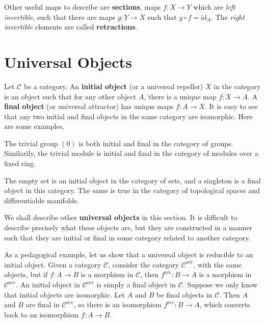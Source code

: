 Other useful maps to describe are {\bf sections}, maps $f: X \to Y$ which are {\it left invertible}, such that there are maps $g: Y \to X$ such that $g \circ f = \text{id}_A$. The {\it right invertible} elements are called {\bf retractions}.

\section{Universal Objects}

Let $\mathcal{C}$ be a category. An {\bf initial object} (or a universal repeller) $X$ in the category is an object such that for any other object $A$, there is a unique map $f: X \to A$. A {\bf final object} (or universal attractor) has unique maps $f: A \to X$. It is easy to see that any two initial and final objects in the same category are isomorphic. Here are some examples,
%
\begin{example}
    The trivial group $(0)$ is both initial and final in the category of groups. Similarily, the trivial module is initial and final in the category of modules over a fixed ring.
\end{example}

\begin{example}
    The empty set is an initial object in the category of sets, and a singleton is a final object in this category. The same is true in the category of topological spaces and differentiable manifolds.
\end{example}

We shall describe other {\bf universal objects} in this section. It is difficult to describe precisely what these objects are, but they are constructed in a manner such that they are initial or final in some category related to another category.

\begin{example}
    As a pedagogical example, let us show that a universal object is reducible to an initial object. Given a category $\mathcal{C}$, consider the category $\mathcal{C}^{\text{rev}}$, with the same objects, but if $f: A \to B$ is a morphism in $\mathcal{C}$, then $f^{\text{rev}}: B \to A$ is a morphism in $\mathcal{C}^{\text{rev}}$. An initial object in $\mathcal{C}^{\text{rev}}$ is simply a final object in $\mathcal{C}$. Suppose we only know that initial objects are isomorphic. Let $A$ and $B$ be final objects in $\mathcal{C}$. Then $A$ and $B$ are final in $\mathcal{C}^{\text{rev}}$, so there is an isomorphism $f^{\text{rev}}: B \to A$, which converts back to an isomorphism $f: A \to B$.
\end{example}

